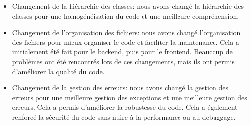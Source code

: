 \begin{itemize}
    \item Changement de la hiérarchie des classes: nous avons changé la hiérarchie des classes pour
    une homogénéisation du code et une meilleure compréhension.
    \item Changement de l'organisation des fichiers: nous avons changé l'organisation des fichiers pour
    mieux organiser le code et faciliter la maintenance. Cela a initialement été fait pour le backend, puis
    pour le frontend. Beaucoup de problèmes ont été rencontrés lors de ces changements, mais ils ont permis
    d'améliorer la qualité du code.
    \item Changement de la gestion des erreurs: nous avons changé la gestion des erreurs pour une meilleure
    gestion des exceptions et une meilleure gestion des erreurs. Cela a permis d'améliorer la robustesse du code.
    Cela a également renforcé la sécurité du code sans nuire à la performance ou au debuggage.
\end{itemize}

